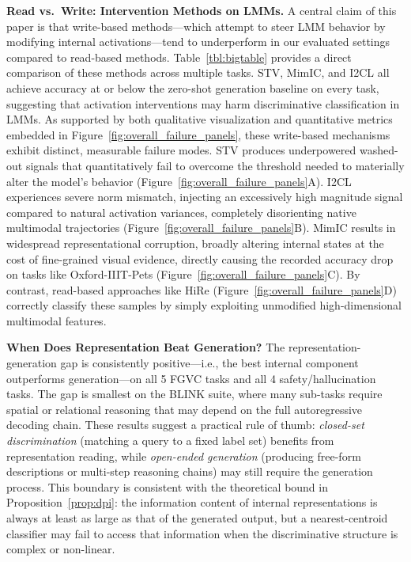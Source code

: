 \documentclass[sigconf,review,anonymous,9pt,table]{acmart}
\newcommand{\minisection}[1]{\smallskip\noindent\textbf{#1}}
\begin{document}
\minisection{Read vs.\ Write: Intervention Methods on LMMs.}
A central claim of this paper is that write-based methods—which attempt to steer LMM behavior by modifying internal activations—tend to underperform in our evaluated settings compared to read-based methods.
Table~\ref{tbl:bigtable} provides a direct comparison of these methods across multiple tasks.
STV, MimIC, and I2CL all achieve accuracy at or below the zero-shot generation baseline on every task, suggesting that activation interventions may harm discriminative classification in LMMs.
As supported by both qualitative visualization and quantitative metrics embedded in Figure~\ref{fig:overall_failure_panels}, these write-based mechanisms exhibit distinct, measurable failure modes. 
STV produces underpowered washed-out signals that quantitatively fail to overcome the threshold needed to materially alter the model's behavior (Figure~\ref{fig:overall_failure_panels}A). 
I2CL experiences severe norm mismatch, injecting an excessively high magnitude signal compared to natural activation variances, completely disorienting native multimodal trajectories (Figure~\ref{fig:overall_failure_panels}B). 
MimIC results in widespread representational corruption, broadly altering internal states at the cost of fine-grained visual evidence, directly causing the recorded accuracy drop on tasks like Oxford-IIIT-Pets (Figure~\ref{fig:overall_failure_panels}C). 
By contrast, read-based approaches like HiRe (Figure~\ref{fig:overall_failure_panels}D) correctly classify these samples by simply exploiting unmodified high-dimensional multimodal features.

\minisection{When Does Representation Beat Generation?}
The representation-generation gap is consistently positive—i.e., the best internal component outperforms generation—on all 5 FGVC tasks and all 4 safety/hallucination tasks.
The gap is smallest on the BLINK suite, where many sub-tasks require spatial or relational reasoning that may depend on the full autoregressive decoding chain.
These results suggest a practical rule of thumb: \emph{closed-set discrimination} (matching a query to a fixed label set) benefits from representation reading, while \emph{open-ended generation} (producing free-form descriptions or multi-step reasoning chains) may still require the generation process.
This boundary is consistent with the theoretical bound in Proposition~\ref{prop:dpi}: the information content of internal representations is always at least as large as that of the generated output, but a nearest-centroid classifier may fail to access that information when the discriminative structure is complex or non-linear.
\end{document}
